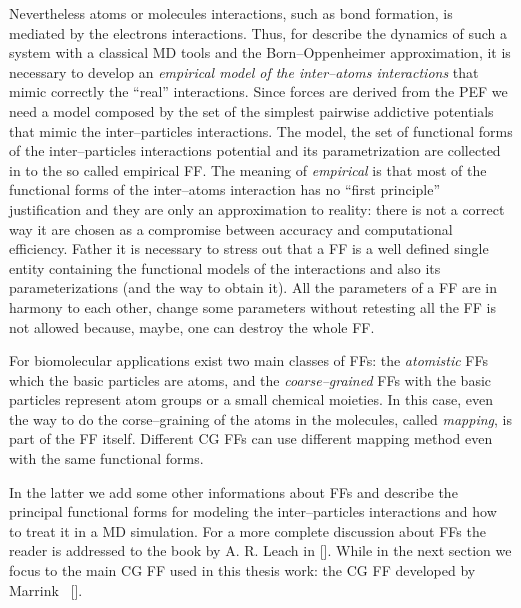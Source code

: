 Nevertheless atoms or molecules interactions, such as bond formation, is mediated by the electrons interactions. Thus, for describe the dynamics of such a system with a classical \ac{MD} tools and the Born--Oppenheimer approximation, it is necessary to develop an \textit{empirical model of the inter--atoms interactions} that mimic correctly the ``real'' interactions. Since forces are derived from the \ac{PEF} we need a model composed by the set of the simplest pairwise addictive potentials that mimic the inter--particles interactions. The model, the set of functional forms of the inter--particles interactions potential and its parametrization are collected in to the so called empirical \acf{FF}. The meaning of \textit{empirical} is that most of the functional forms of the inter--atoms interaction has no ``first principle'' justification and they are only an approximation to reality: there is not a correct way it are chosen as a compromise between accuracy and computational efficiency. Father it is necessary to stress out that a \ac{FF} is a well defined single entity containing the functional models of the interactions and also its parameterizations (and the way to obtain it). All the parameters of a \ac{FF} are in harmony to each other, change some parameters without retesting all the \ac{FF} is not allowed because, maybe, one can destroy the whole \ac{FF}.

For biomolecular applications exist two main classes of \acp{FF}: the \textit{atomistic} \acp{FF} which the basic particles are atoms, and the \textit{coarse--grained} \acp{FF} with the basic particles represent atom groups or a small chemical moieties. In this case, even the way to do the corse--graining of the atoms in the molecules, called \textit{mapping}, is part of the \ac{FF} itself. Different \ac{CG} \acp{FF} can use different mapping method even with the same functional forms.

In the latter we add some other informations about \acp{FF} and describe the principal functional forms for modeling the inter--particles interactions and how to treat it in a \ac{MD} simulation. For a more complete discussion about \acp{FF} the reader is addressed to the book by A. R. Leach in []. While in the next section we focus to the main \ac{CG} \ac{FF} used in this thesis work: the  \ac{CG} \ac{FF} developed by Marrink \etal\, [].

